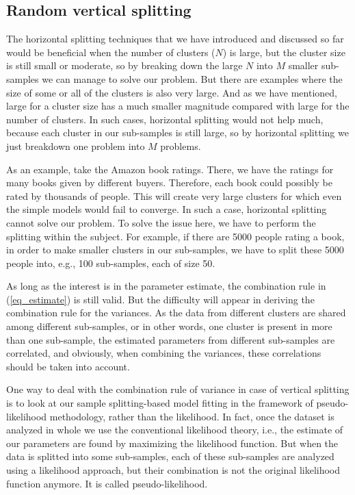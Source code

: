 \documentclass[11pt,a5paper,twoside]{book}
\begin{document}
\subsection{Random vertical splitting}

The horizontal splitting techniques that we have introduced and discussed so far would be beneficial when the number of clusters ($N$) is large, but the cluster size is still small or moderate, so by breaking down the large $N$ into $M$ smaller sub-samples we can manage to solve our problem. But there are examples where the size of some or all of the clusters is also very large. And as we have mentioned, large for a cluster size has a much smaller magnitude compared with large for the number of clusters. In such cases, horizontal splitting would not help much, because each cluster in our sub-samples is still large, so by horizontal splitting we just breakdown one problem into $M$ problems. 

As an example, take the Amazon book ratings. There, we have the ratings for many books given by different buyers. Therefore, each book could possibly be rated by thousands of people. This will create very large clusters for which even the simple models would fail to converge. In such a case, horizontal splitting cannot solve our problem. To solve the issue here, we have to perform the splitting within the subject. For example, if there are 5000 people rating a book, in order to make smaller clusters in our sub-samples, we have to split these 5000 people into, e.g., 100 sub-samples, each of size 50. 

As long as the interest is in the parameter estimate, the combination rule in (\ref{eq_estimate}) is still valid. But the difficulty will appear in deriving the combination rule for the variances. As the data from different clusters are shared among different sub-samples, or in other words, one cluster is present in more than one sub-sample, the estimated parameters from different sub-samples are correlated, and obviously, when combining the variances, these correlations should be taken into account. 

One way to deal with the combination rule of variance in case of vertical splitting is to look at our sample splitting-based model fitting in the framework of pseudo-likelihood methodology, rather than the likelihood. In fact, once the dataset is analyzed in whole we use the conventional likelihood theory, i.e., the estimate of our parameters are found by maximizing the likelihood function. But when the data is splitted into some sub-samples, each of these sub-samples are analyzed using a likelihood approach, but their combination is not the original likelihood function anymore. It is called pseudo-likelihood. 
\end{document}
